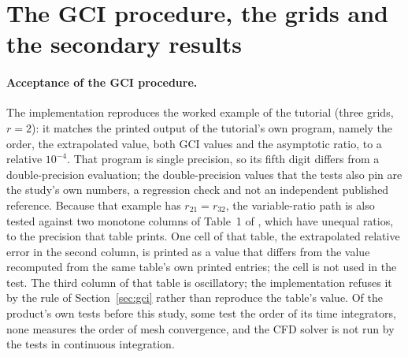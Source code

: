 \documentclass[twocolumn]{labreport}
\begin{document}



\appendix

\section{The GCI procedure, the grids and the secondary results}
\label{sec:appA}

\paragraph{Acceptance of the GCI procedure.}
The implementation reproduces the worked example of the tutorial \citep{nparc_spatial} (three grids, $r=2$): it matches the printed output of the tutorial's own program, namely the order, the extrapolated value, both GCI values and the asymptotic ratio, to a relative $10^{-4}$.
That program is single precision, so its fifth digit differs from a double-precision evaluation; the double-precision values that the tests also pin are the study's own numbers, a regression check and not an independent published reference.
Because that example has $r_{21}=r_{32}$, the variable-ratio path is also tested against two monotone columns of Table~1 of \citet{celik2008}, which have unequal ratios, to the precision that table prints.
One cell of that table, the extrapolated relative error in the second column, is printed as a value that differs from the value recomputed from the same table's own printed entries; the cell is not used in the test.
The third column of that table is oscillatory; the implementation refuses it by the rule of Section~\ref{sec:gci} rather than reproduce the table's value.
Of the product's own tests before this study, some test the order of its time integrators, none measures the order of mesh convergence, and the CFD solver is not run by the tests in continuous integration.
\end{document}
